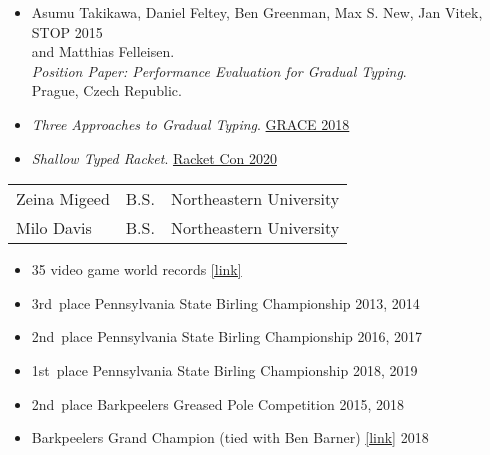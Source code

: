 \documentclass{article}
\begin{document}
\begin{itemize}
\item
  Asumu Takikawa, Daniel Feltey, Ben Greenman, Max S. New, Jan Vitek, \hfill STOP 2015 \\
   and Matthias Felleisen. \\
   \emph{Position Paper: Performance Evaluation for Gradual Typing}. \\
  Prague, Czech Republic.
\end{itemize}

\newpage
{}
\begin{itemize}
  \item \emph{Three Approaches to Gradual Typing}. \hfill \href{https://2018.splashcon.org/track/grace-2018-papers}{GRACE 2018}
  \item \emph{Shallow Typed Racket}. \hfill \href{https://con.racket-lang.org/2020}{Racket Con 2020}
\end{itemize}



\begin{tabular}{l l l}
  Zeina Migeed & B.S. & Northeastern University
  \\[1ex]
  Milo Davis   & B.S. & Northeastern University
\end{tabular}



\begin{itemize}
  \item 35 video game world records \href{https://www.twingalaxies.com/scores.php?player=43761}{[link]} \hfill {}
  \item 3rd~place Pennsylvania State Birling Championship \hfill 2013, 2014
  \item 2nd~place Pennsylvania State Birling Championship \hfill 2016, 2017
  \item 1st~place Pennsylvania State Birling Championship \hfill 2018, 2019
  \item 2nd~place Barkpeelers Greased Pole Competition \hfill 2015, 2018
  \item Barkpeelers Grand Champion (tied with Ben Barner) \href{http://lumbermuseum.org/bark-peeler-festival/festival-events-2019/bark-peeler-festival-2018/}{[link]} \hfill 2018
\end{itemize}
\end{document}
